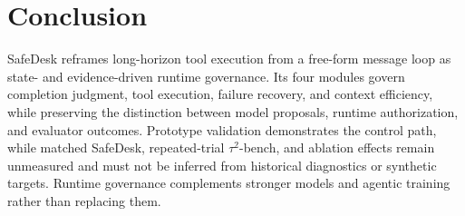 \documentclass[10pt]{article}
\newcommand{\safedesk}{SafeDesk}
\begin{document}
\section{Conclusion}

\safedesk{} reframes long-horizon tool execution from a free-form message loop as
state- and evidence-driven runtime governance. Its four modules govern completion
judgment, tool execution, failure recovery, and context efficiency, while preserving
the distinction between model proposals, runtime authorization, and evaluator
outcomes. Prototype validation demonstrates the control path, while matched
SafeDesk, repeated-trial $\tau^2$-bench, and ablation effects remain unmeasured
and must not be inferred from historical diagnostics or synthetic targets. Runtime
governance complements stronger models and agentic training rather than replacing them.

\appendix









\end{document}
